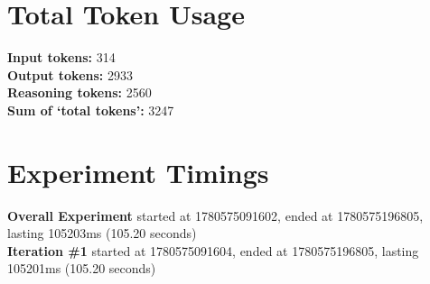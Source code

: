 \documentclass{article}
\begin{document}
\section*{Total Token Usage}
\textbf{Input tokens: }314
\\\textbf{Output tokens: }2933
\\\textbf{Reasoning tokens: }2560
\\\textbf{Sum of `total tokens': }3247
\section*{Experiment Timings}
\textbf{Overall Experiment} started at 1780575091602, ended at 1780575196805, lasting 105203ms (105.20 seconds)
\\\textbf{Iteration \#1} started at 1780575091604, ended at 1780575196805, lasting 105201ms (105.20 seconds)
\end{document}
